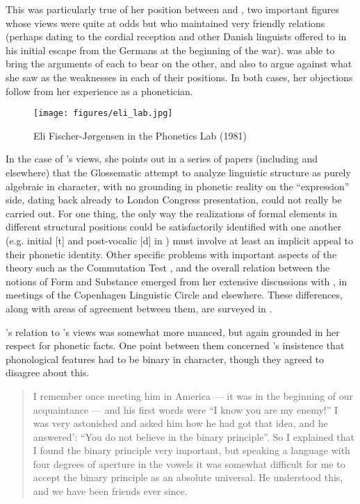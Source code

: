 This was particularly true of her position between {\Hjelmslev} and
{\Jakobson}, two important figures whose views were quite at odds but who
maintained very friendly relations (perhaps dating to the cordial
reception {\Hjelmslev} and other {Danish} linguists offered to {\Jakobson} in
his initial escape from the Germans at the beginning of the war). {\Eli}
was able to bring the arguments of each to bear on the other, and also
to argue against what she saw as the weaknesses in each of their
positions. In both cases, her objections follow from her experience as
a phonetician.

\begin{wrapfigure}[16]{r}{.4\textwidth}
  \texttt{[image: figures/eli\_lab.jpg]}
  \caption{Eli Fischer-Jørgensen in the Phonetics Lab (1981)}
  \label{fig:ch.hjelmslev.efj_lab}
\end{wrapfigure}
In the case of {\Hjelmslev}'s views, she points out in a series of papers
(including \citealt{efj43:rvw.hjelmslev,efj52:distribution} and
elsewhere) that the Glossematic attempt to analyze linguistic
structure as purely algebraic in character, with no grounding in
phonetic reality on the ``expression'' side, dating back already to
 London Congress
presentation, could not really be carried out. For one thing, the only
way the realizations of formal elements in different structural
positions could be satisfactorily identified with one another
(e.g. initial {[t]} and post-vocalic {[d]} in ) must involve at
least an implicit appeal to their phonetic identity. Other specific
problems with important aspects of the theory such as the Commutation
Test \citep{efj56:commutation}, and the overall relation between the
notions of Form and Substance \citep{efj66:form.and.substance} emerged
from her extensive discussions with {\Hjelmslev}, in meetings of the
Copenhagen Linguistic Circle and elsewhere. These differences, along
with areas of agreement between them, are surveyed in
\citealt[chap. 7]{fischer-jorgensen75:trends}.

{\Eli}'s relation to {\Jakobson}'s views was somewhat more nuanced, but
again grounded in her respect for phonetic facts. One point between
them concerned {\Jakobson}'s insistence that phonological features had to
be binary in character, though they agreed to disagree about this.
\begin{quotation}
  I remember once meeting him in America --- it was in the beginning
  of our acquaintance --- and his first words were ``I know you are my
  enemy!'' I was very astonished and asked him how he had got that
  idea, and he answered': ``You do not believe in the binary
  principle''. So I explained that I found the binary principle very
  important, but speaking a language with four degrees of aperture in
  the vowels it was somewhat difficult for me to accept the binary
  principle as an absolute universal. He understood this, and we have
  been friends ever since. \citep[23]{efj97:jakobson}
\end{quotation}

